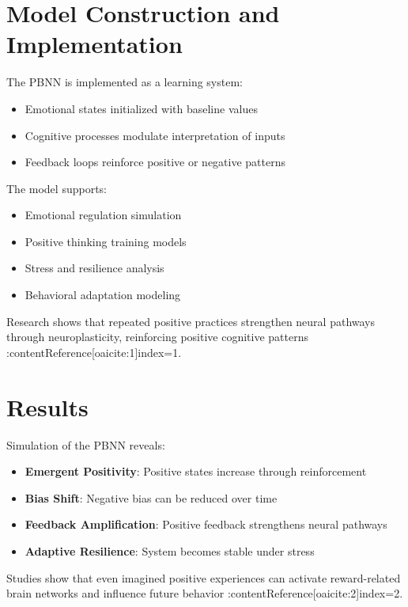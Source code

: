 \documentclass[12pt]{article}
\begin{document}
\section{Model Construction and Implementation}

The PBNN is implemented as a learning system:

\begin{itemize}
\item Emotional states initialized with baseline values
\item Cognitive processes modulate interpretation of inputs
\item Feedback loops reinforce positive or negative patterns
\end{itemize}

The model supports:

\begin{itemize}
\item Emotional regulation simulation
\item Positive thinking training models
\item Stress and resilience analysis
\item Behavioral adaptation modeling
\end{itemize}

Research shows that repeated positive practices strengthen neural pathways through neuroplasticity, reinforcing positive cognitive patterns :contentReference[oaicite:1]{index=1}.

\section{Results}

Simulation of the PBNN reveals:

\begin{itemize}
\item \textbf{Emergent Positivity}: Positive states increase through reinforcement
\item \textbf{Bias Shift}: Negative bias can be reduced over time
\item \textbf{Feedback Amplification}: Positive feedback strengthens neural pathways
\item \textbf{Adaptive Resilience}: System becomes stable under stress
\end{itemize}

Studies show that even imagined positive experiences can activate reward-related brain networks and influence future behavior :contentReference[oaicite:2]{index=2}.
\end{document}
